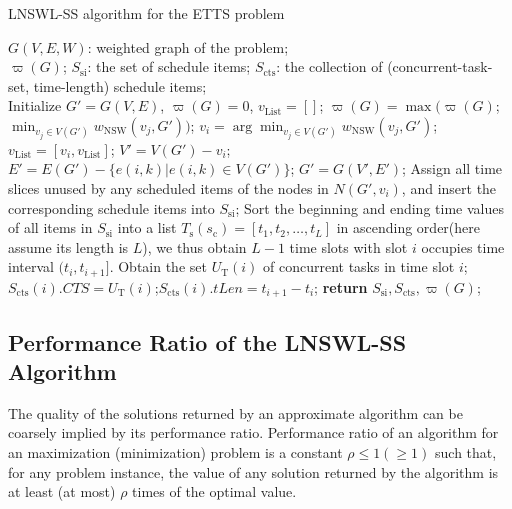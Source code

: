 \documentclass[12pt,journal,onecolumn,draftcls]{IEEEtran}
\begin{document}
\begin{algorithm}[!htb]
\caption{LNSWL-SS algorithm for the ETTS problem}
\begin{algorithmic}[1]\label{Alg_LNSWL_SS}
    \REQUIRE $G(V,E,W)$: weighted graph of the problem;\\
    \ENSURE $\varpi(G)$; $S_\text{si}$: the set of schedule items;
    $S_\text{cts}$: the collection of (concurrent-task-set, time-length) schedule items;\\
    \STATE Initialize $G'{=}G(V,E)$, $\varpi(G){=}0$, $v_\text{List}{=}[ ]$;
    \label{seqbegin}
        \STATE $\varpi(G){=}\max(\varpi(G)$;$\min_{v_j{\in}V(G')}w_\text{NSW}(v_j,G'))$;\label{v_update}
        \STATE $v_i{=}\arg\min_{v_j{\in}V(G')}w_\text{NSW}(v_j,G')$; $v_\text{List}=[v_i,v_\text{List}]$;
        \STATE $V'{=}V(G'){-}v_i$; $E'{=}E(G'){-}\{e(i,k)|e(i,k){\in}V(G')\}$;
        \STATE $G'{=}G(V',E')$;
    \ENDWHILE \label{seqend}
     \label{schbegin}
        \STATE Assign all time slices unused by any scheduled items of the nodes in $N(G',v_i)$, and insert the corresponding schedule items into $S_\text{si}$;
    \ENDFOR \label{schend}
    \STATE Sort the beginning and ending time values of all items in $S_\text{si}$ into a list $T_\text{s}(s_\text{c}){=}[t_1,t_2,\ldots,t_{L}]$ in ascending order(here assume its length is $L$), we thus obtain $L{-}1$ time slots with slot $i$ occupies time interval $(t_{i},t_{i{+}1}]$.\label{ctsbegin}
        \STATE Obtain the set $U_\text{T}(i)$ of concurrent tasks in time slot $i$;
        \STATE $S_\text{cts}(i).CTS{=}U_\text{T}(i)$;$S_\text{cts}(i).tLen{=}t_{i{+}1}{-}t_{i}$;
    \ENDFOR \label{ctsend}
    \STATE \textbf{return} $S_\text{si}, S_\text{cts}, \varpi(G)$;
\end{algorithmic}
\end{algorithm}

\subsection{Performance Ratio of the LNSWL-SS Algorithm}

The quality of the solutions returned by an approximate algorithm can be coarsely implied by its performance ratio. Performance ratio of an algorithm for an maximization (minimization) problem is a constant $\rho{\leq}1({\geq}1)$ such that, for any problem instance, the value of any solution returned by the algorithm is at least (at most) ${\rho}$ times of the optimal value.
\end{document}

